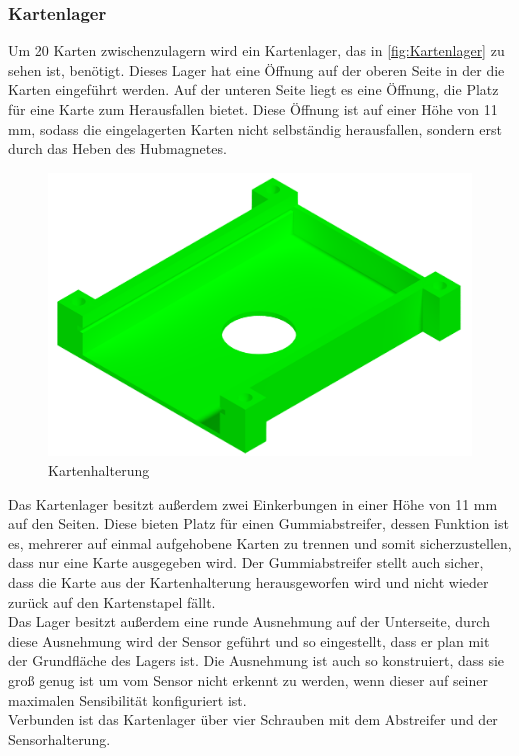 \subsubsection{Kartenlager}

Um 20 Karten zwischenzulagern wird ein Kartenlager, das in \autoref{fig:Kartenlager} zu sehen ist, benötigt.
Dieses Lager hat eine Öffnung auf der oberen Seite in der die Karten eingeführt werden.
Auf der unteren Seite liegt es eine Öffnung, die Platz für eine Karte zum Herausfallen bietet.
Diese Öffnung ist auf einer Höhe von 11 mm, sodass die eingelagerten Karten nicht selbständig herausfallen, sondern erst durch das Heben des Hubmagnetes.\\
\begin{figure}
    \includegraphics[width=8 cm]{fig/mech/Kartenhalterung.PNG}
    \caption{Kartenhalterung}
    \label{fig:Kartenlager}
\end{figure}
Das Kartenlager besitzt außerdem zwei Einkerbungen in einer Höhe von 11 mm auf den Seiten.
Diese bieten Platz für einen Gummiabstreifer, dessen Funktion ist es, mehrerer auf einmal aufgehobene Karten zu trennen und somit sicherzustellen, dass nur eine Karte ausgegeben wird.
Der Gummiabstreifer stellt auch sicher, dass die Karte aus der Kartenhalterung herausgeworfen wird und nicht wieder zurück auf den Kartenstapel
fällt. \\
Das Lager besitzt außerdem eine runde Ausnehmung auf der Unterseite, durch diese Ausnehmung wird der Sensor geführt und so eingestellt,
dass er plan mit der Grundfläche des Lagers ist.
Die Ausnehmung ist auch so konstruiert, dass sie groß genug ist um vom Sensor nicht erkennt zu werden, wenn dieser auf seiner maximalen Sensibilität konfiguriert ist.\\
Verbunden ist das Kartenlager über vier Schrauben mit dem Abstreifer und der Sensorhalterung.



